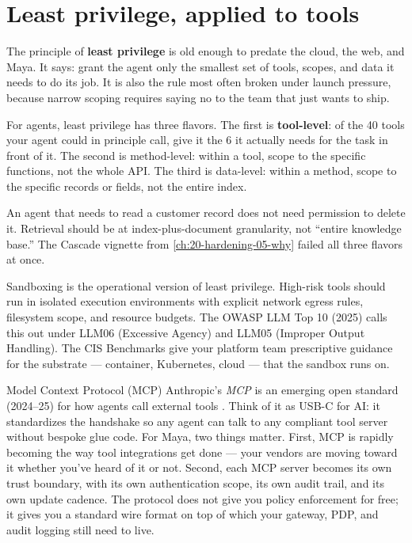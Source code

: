 \section{Least privilege, applied to tools}

The principle of \textbf{least privilege} is old enough to predate the cloud, the web, and Maya. It says: grant the agent only the smallest set of tools, scopes, and data it needs to do its job. It is also the rule most often broken under launch pressure, because narrow scoping requires saying no to the team that just wants to ship.

For agents, least privilege has three flavors. The first is \textbf{tool-level}: of the 40 tools your agent could in principle call, give it the 6 it actually needs for the task in front of it. The second is method-level: within a tool, scope to the specific functions, not the whole API. The third is data-level: within a method, scope to the specific records or fields, not the entire index.

An agent that needs to read a customer record does not need permission to delete it. Retrieval should be at index-plus-document granularity, not ``entire knowledge base.'' The Cascade vignette from \autoref{ch:20-hardening-05-why} failed all three flavors at once.

Sandboxing is the operational version of least privilege. High-risk tools should run in isolated execution environments with explicit network egress rules, filesystem scope, and resource budgets. The OWASP LLM Top 10 (2025) calls this out under LLM06 (Excessive Agency) and LLM05 (Improper Output Handling). The CIS Benchmarks give your platform team prescriptive guidance for the substrate --- container, Kubernetes, cloud --- that the sandbox runs on.

\begin{TNinpractice}{Model Context Protocol (MCP)}
Anthropic's \textit{MCP} is an emerging open standard (2024--25) for how agents call external tools \citep{mcp-spec}. Think of it as USB-C for AI: it standardizes the handshake so any agent can talk to any compliant tool server without bespoke glue code. For Maya, two things matter. First, MCP is rapidly becoming the way tool integrations get done --- your vendors are moving toward it whether you've heard of it or not. Second, each MCP server becomes its own trust boundary, with its own authentication scope, its own audit trail, and its own update cadence. The protocol does not give you policy enforcement for free; it gives you a standard wire format on top of which your gateway, PDP, and audit logging still need to live.
\end{TNinpractice}

